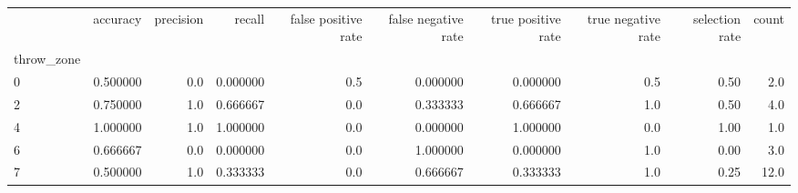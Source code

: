\begin{tabular}{lrrrrrrrrr}
\toprule
{} &  accuracy &  precision &    recall &  false positive rate &  false negative rate &  true positive rate &  true negative rate &  selection rate &  count \\
throw\_zone &           &            &           &                      &                      &                     &                     &                 &        \\
\midrule
0          &  0.500000 &        0.0 &  0.000000 &                  0.5 &             0.000000 &            0.000000 &                 0.5 &            0.50 &    2.0 \\
2          &  0.750000 &        1.0 &  0.666667 &                  0.0 &             0.333333 &            0.666667 &                 1.0 &            0.50 &    4.0 \\
4          &  1.000000 &        1.0 &  1.000000 &                  0.0 &             0.000000 &            1.000000 &                 0.0 &            1.00 &    1.0 \\
6          &  0.666667 &        0.0 &  0.000000 &                  0.0 &             1.000000 &            0.000000 &                 1.0 &            0.00 &    3.0 \\
7          &  0.500000 &        1.0 &  0.333333 &                  0.0 &             0.666667 &            0.333333 &                 1.0 &            0.25 &   12.0 \\
\bottomrule
\end{tabular}
